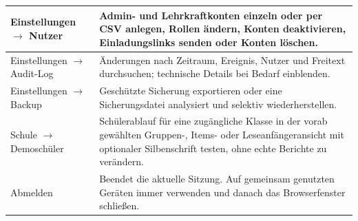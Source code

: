 \documentclass[12pt,a4paper]{article}
\begin{document}
\begin{longtable}{|p{}|p{}|}
\hline
Einstellungen \(\rightarrow\) Nutzer & Admin- und Lehrkraftkonten einzeln oder per CSV anlegen, Rollen ändern, Konten deaktivieren, Einladungslinks senden oder Konten löschen.\\
\hline
Einstellungen \(\rightarrow\) Audit-Log & Änderungen nach Zeitraum, Ereignis, Nutzer und Freitext durchsuchen; technische Details bei Bedarf einblenden.\\
\hline
Einstellungen \(\rightarrow\) Backup & Geschützte Sicherung exportieren oder eine Sicherungsdatei analysiert und selektiv wiederherstellen.\\
\hline
Schule \(\rightarrow\) Demoschüler & Schülerablauf für eine zugängliche Klasse in der vorab gewählten Gruppen-, Items- oder Leseanfängeransicht mit optionaler Silbenschrift testen, ohne echte Berichte zu verändern.\\
\hline
Abmelden & Beendet die aktuelle Sitzung. Auf gemeinsam genutzten Geräten immer verwenden und danach das Browserfenster schließen.\\
\hline
\end{longtable}
\normalsize
\end{document}
